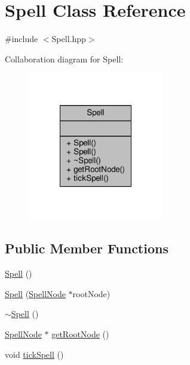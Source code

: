 \hypertarget{class_spell}{\section{Spell Class Reference}
\label{class_spell}
}


{\ttfamily \#include $<$Spell.\-hpp$>$}



Collaboration diagram for Spell\-:
\nopagebreak
\begin{figure}[H]
\begin{center}
\leavevmode
\includegraphics[width=168pt]{class_spell__coll__graph}
\end{center}
\end{figure}
\subsection*{Public Member Functions}
\begin{DoxyCompactItemize}
\item 
\hyperlink{class_spell_a614361c1702859a162e1572030166cb0}{Spell} ()
\item 
\hyperlink{class_spell_a868259bb869176239ef3fb1e8f0d198c}{Spell} (\hyperlink{class_spell_node}{Spell\-Node} $\ast$root\-Node)
\item 
\hyperlink{class_spell_ab00bfde34dc5dcdc6e1035608e14c067}{$\sim$\-Spell} ()
\item 
\hyperlink{class_spell_node}{Spell\-Node} $\ast$ \hyperlink{class_spell_a8b234c2b1930d3dfc1954c6d4a30cdac}{get\-Root\-Node} ()
\item 
void \hyperlink{class_spell_a538fe9e612d1ce78820587fe208d675e}{tick\-Spell} ()
\end{DoxyCompactItemize}


